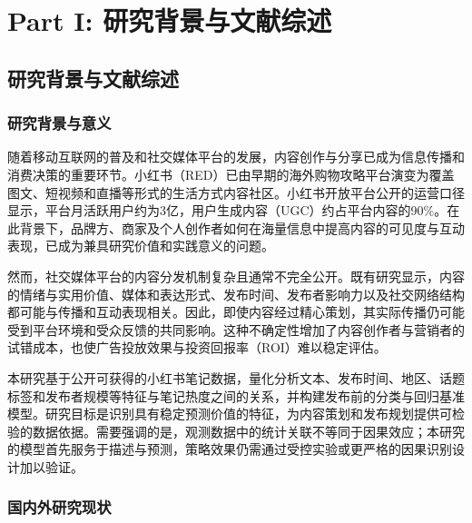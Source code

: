 \part{Part I: 研究背景与文献综述}

\chapter{研究背景与文献综述}




\section{研究背景与意义}
随着移动互联网的普及和社交媒体平台的发展，内容创作与分享已成为信息传播和消费决策的重要环节。小红书（RED）已由早期的海外购物攻略平台演变为覆盖图文、短视频和直播等形式的生活方式内容社区。小红书开放平台公开的运营口径显示，平台月活跃用户约为3亿，用户生成内容（UGC）约占平台内容的90\%\cite{XiaohongshuOpenPlatform2026}。在此背景下，品牌方、商家及个人创作者如何在海量信息中提高内容的可见度与互动表现，已成为兼具研究价值和实践意义的问题。

然而，社交媒体平台的内容分发机制复杂且通常不完全公开。既有研究显示，内容的情绪与实用价值、媒体和表达形式、发布时间、发布者影响力以及社交网络结构都可能与传播和互动表现相关\cite{BergerMilkman2012,DeVriesGenslerLeeflang2012,CvijikjMichahelles2013,BakshyEtAl2011}。因此，即使内容经过精心策划，其实际传播仍可能受到平台环境和受众反馈的共同影响。这种不确定性增加了内容创作者与营销者的试错成本，也使广告投放效果与投资回报率（ROI）难以稳定评估。

本研究基于公开可获得的小红书笔记数据，量化分析文本、发布时间、地区、话题标签和发布者规模等特征与笔记热度之间的关系，并构建发布前的分类与回归基准模型。研究目标是识别具有稳定预测价值的特征，为内容策划和发布规划提供可检验的数据依据。需要强调的是，观测数据中的统计关联不等同于因果效应；本研究的模型首先服务于描述与预测，策略效果仍需通过受控实验或更严格的因果识别设计加以验证。

\section{国内外研究现状}
